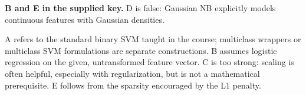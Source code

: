 \textbf{B and E in the supplied key.} D is false: Gaussian NB explicitly models continuous features with Gaussian densities.


A refers to the standard binary SVM taught in the course; multiclass wrappers or multiclass SVM formulations are separate constructions. B assumes logistic regression on the given, untransformed feature vector. C is too strong: scaling is often helpful, especially with regularization, but is not a mathematical prerequisite. E follows from the sparsity encouraged by the L1 penalty.
